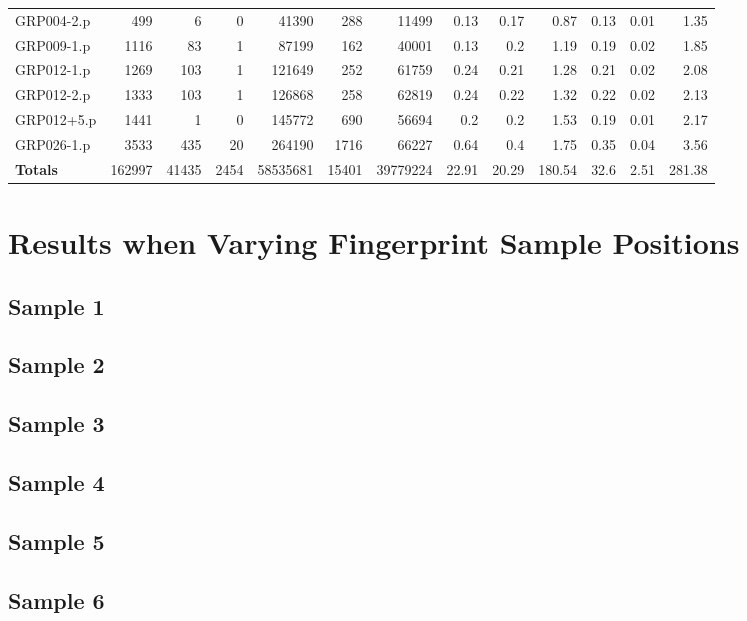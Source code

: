 \begin{table}[H]
\begin{adjustwidth}{-0.4in}{-0.5in}
\begin{tabular}{| l || r | r | r || r | r | r || r | r | r | r | r | r |}
GRP004-2.p&499&6&0&41390&288&11499&0.13&0.17&0.87&0.13&0.01&1.35\\
GRP009-1.p&1116&83&1&87199&162&40001&0.13&0.2&1.19&0.19&0.02&1.85\\
GRP012-1.p&1269&103&1&121649&252&61759&0.24&0.21&1.28&0.21&0.02&2.08\\
GRP012-2.p&1333&103&1&126868&258&62819&0.24&0.22&1.32&0.22&0.02&2.13\\
GRP012+5.p&1441&1&0&145772&690&56694&0.2&0.2&1.53&0.19&0.01&2.17\\
GRP026-1.p&3533&435&20&264190&1716&66227&0.64&0.4&1.75&0.35&0.04&3.56\\ \hline \hline
\textbf{Totals}&162997&41435&2454&58535681&15401&39779224&22.91&20.29&180.54&32.6&2.51&281.38 \\ \hline
\end{tabular}\end{adjustwidth}\end{table}


\chapter{Results when Varying Fingerprint Sample Positions}
\label{app:app2}

\section{Sample 1}

\section{Sample 2}

\section{Sample 3}

\section{Sample 4}

\section{Sample 5}

\section{Sample 6}

